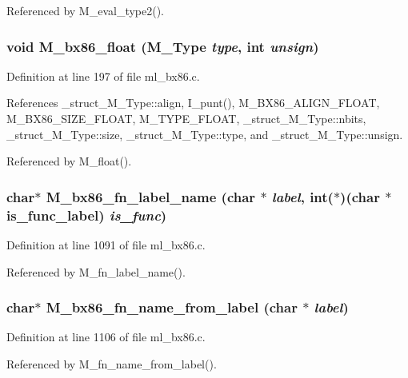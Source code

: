 Referenced by M\_\-eval\_\-type2().
\subsubsection{\setlength{\rightskip}{0pt plus 5cm}void M\_\-bx86\_\-float (\bf{M\_\-Type} {\em type}, int {\em unsign})}\label{m__bx86_8h_2fa536e8b323a4e8e649f7e998151b34}




Definition at line 197 of file ml\_\-bx86.c.

References \_\-struct\_\-M\_\-Type::align, I\_\-punt(), M\_\-BX86\_\-ALIGN\_\-FLOAT, M\_\-BX86\_\-SIZE\_\-FLOAT, M\_\-TYPE\_\-FLOAT, \_\-struct\_\-M\_\-Type::nbits, \_\-struct\_\-M\_\-Type::size, \_\-struct\_\-M\_\-Type::type, and \_\-struct\_\-M\_\-Type::unsign.

Referenced by M\_\-float().
\subsubsection{\setlength{\rightskip}{0pt plus 5cm}char$\ast$ M\_\-bx86\_\-fn\_\-label\_\-name (char $\ast$ {\em label}, int($\ast$)(char $\ast$is\_\-func\_\-label) {\em is\_\-func})}\label{m__bx86_8h_c9d91fe91085f54571271645c4a0fc50}




Definition at line 1091 of file ml\_\-bx86.c.

Referenced by M\_\-fn\_\-label\_\-name().
\subsubsection{\setlength{\rightskip}{0pt plus 5cm}char$\ast$ M\_\-bx86\_\-fn\_\-name\_\-from\_\-label (char $\ast$ {\em label})}\label{m__bx86_8h_4ac7df30459f8683618d00a724f44c74}




Definition at line 1106 of file ml\_\-bx86.c.

Referenced by M\_\-fn\_\-name\_\-from\_\-label().
